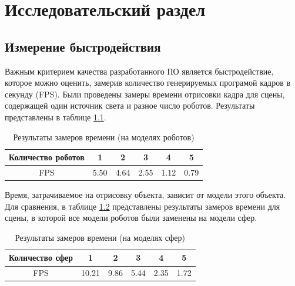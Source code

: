 \chapter{Исследовательский раздел}

\section{Измерение быстродействия}

Важным критерием качества разработанного ПО является быстродействие, которое можно оценить, замерив количество генерируемых програмой кадров в секунду (FPS). Были проведены замеры времени отрисовки кадра для сцены, содержащей один источник света и разное число роботов. Результаты представлены в таблице \ref{tbl:fps}.

\begin{table}[h]
	\begin{center}
		\begin{threeparttable}
			\captionsetup{justification=raggedright,singlelinecheck=off}
			\caption{Результаты замеров времени (на моделях роботов)}
			\label{tbl:fps}
			\begin{tabular}{|c|c|c|c|c|c|}
				\hline
				Количество роботов & 1 & 2 & 3 & 4 & 5 \\
				\hline
				FPS & 5.50 & 4.64 & 2.55 & 1.12 & 0.79 \\
				\hline
			\end{tabular}
		\end{threeparttable}
	\end{center}
\end{table}
Время, затрачиваемое на отрисовку объекта, зависит от модели этого объекта. Для сравнения, в таблице \ref{tbl:fps2} представлены результаты замеров времени для сцены, в которой все модели роботов были заменены на модели сфер.
\begin{table}[h]
	\begin{center}
		\begin{threeparttable}
			\captionsetup{justification=raggedright,singlelinecheck=off}
			\caption{Результаты замеров времени (на моделях сфер)}
			\label{tbl:fps2}
			\begin{tabular}{|c|c|c|c|c|c|}
				\hline
				Количество сфер & 1 & 2 & 3 & 4 & 5 \\
				\hline
				FPS & 10.21 & 9.86 & 5.44 & 2.35 & 1.72 \\
				\hline
			\end{tabular}
		\end{threeparttable}
	\end{center}
\end{table}

